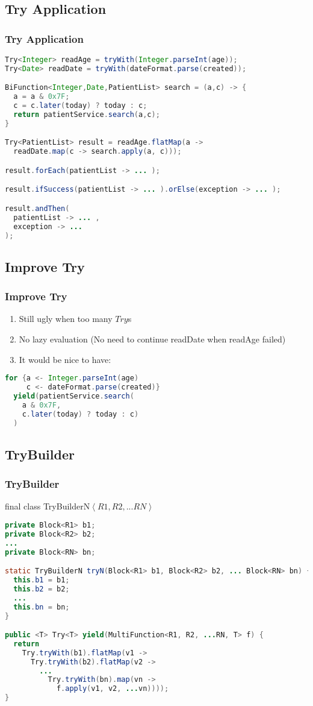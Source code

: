\documentclass{beamer}
\begin{document}
\subsection{Try Application}
\begin{frame}[fragile]
  \frametitle{Try Application}
\begin{lstlisting}[language=Java]
Try<Integer> readAge = tryWith(Integer.parseInt(age));
Try<Date> readDate = tryWith(dateFormat.parse(created));

BiFunction<Integer,Date,PatientList> search = (a,c) -> {
  a = a & 0x7F;
  c = c.later(today) ? today : c;
  return patientService.search(a,c);
}

Try<PatientList> result = readAge.flatMap(a ->
  readDate.map(c -> search.apply(a, c)));

result.forEach(patientList -> ... );

result.ifSuccess(patientList -> ... ).orElse(exception -> ... );

result.andThen(
  patientList -> ... ,
  exception -> ... 
);
\end{lstlisting}
\end{frame}

\subsection{Improve Try}
\begin{frame}[fragile]
  \frametitle{Improve Try}
    \begin{enumerate}
    \item Still ugly when too many $Try$s
    \item No lazy evaluation (No need to continue readDate when readAge failed)
    \item It would be nice to have:
    \end{enumerate}
\begin{lstlisting}[language=Java]
for {a <- Integer.parseInt(age)
     c <- dateFormat.parse(created)} 
  yield(patientService.search(
    a & 0x7F, 
    c.later(today) ? today : c)
  )
\end{lstlisting}
\end{frame}

\subsection{TryBuilder}
\begin{frame}[fragile]
  \frametitle{TryBuilder}
  final class TryBuilderN$\left <R1,R2,...RN \right>$
\begin{lstlisting}[language=Java]
private Block<R1> b1;
private Block<R2> b2;
...
private Block<RN> bn;

static TryBuilderN tryN(Block<R1> b1, Block<R2> b2, ... Block<RN> bn) {
  this.b1 = b1;
  this.b2 = b2;
  ...
  this.bn = bn;
}

public <T> Try<T> yield(MultiFunction<R1, R2, ...RN, T> f) {
  return
    Try.tryWith(b1).flatMap(v1 ->
      Try.tryWith(b2).flatMap(v2 ->
        ...
          Try.tryWith(bn).map(vn ->
            f.apply(v1, v2, ...vn))));
}
\end{lstlisting}
\end{frame}
\end{document}
